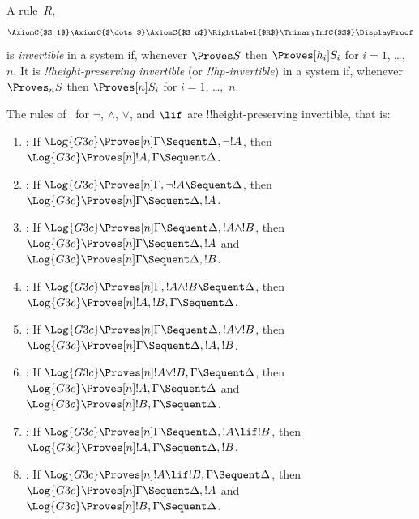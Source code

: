 \documentclass[../../../include/open-logic-section]{subfiles}
\begin{document}


\begin{defn}
A rule~$R$,
\[
\AxiomC{$S_1$}
\AxiomC{$\dots$}
\AxiomC{$S_n$}
\RightLabel{$R$}
\TrinaryInfC{$S$}
\DisplayProof
\]
is \emph{invertible} in a system if, whenever $\Proves S$ then
$\Proves[h_i] S_i$ for $i = 1$, \dots,~$n$. It is
\emph{!!{height}-preserving invertible} (or \emph{!!{hp}-invertible})
in a system if, whenever $\Proves_n S$ then $\Proves[n] S_i$ for $i =
1$, \dots,~$n$.
\end{defn}

\begin{lem}
The rules of~ for $\lnot$, $\land$, $\lor$, and $\lif$ are
!!{height}-preserving invertible, that is:
\begin{enumerate}
  \item \RightR{\lnot}: If $\Log{G3c} \Proves[n] \Gamma \Sequent
  \Delta, \lnot !A$, then $\Log{G3c} \Proves[n] !A, \Gamma \Sequent
  \Delta$.
  \item \LeftR{\lnot}: If $\Log{G3c} \Proves[n] \Gamma, \lnot !A
  \Sequent \Delta$, then $\Log{G3c} \Proves[n] \Gamma \Sequent \Delta,
  !A$.
  \item \RightR{\land}: If $\Log{G3c} \Proves[n] \Gamma \Sequent
  \Delta, !A \land !B$, then $\Log{G3c} \Proves[n] \Gamma \Sequent
  \Delta, !A$ and $\Log{G3c} \Proves[n] \Gamma \Sequent
  \Delta, !B$.
  \item \LeftR{\land}: If $\Log{G3c} \Proves[n] \Gamma, !A \land !B
  \Sequent \Delta$, then $\Log{G3c} \Proves[n] !A, !B, \Gamma \Sequent
  \Delta$.
  \item \RightR{\lor}: If $\Log{G3c} \Proves[n] \Gamma \Sequent
  \Delta, !A \lor !B$, then $\Log{G3c} \Proves[n] \Gamma \Sequent
  \Delta, !A, !B$.
  \item \LeftR{\lor}: If $\Log{G3c} \Proves[n] !A \lor !B, \Gamma \Sequent
  \Delta$, then $\Log{G3c} \Proves[n] !A, \Gamma \Sequent
  \Delta$ and $\Log{G3c} \Proves[n] !B, \Gamma \Sequent
  \Delta$.
  \item \RightR{\lif}: If $\Log{G3c} \Proves[n] \Gamma \Sequent
  \Delta, !A \lif !B$, then $\Log{G3c} \Proves[n] !A, \Gamma \Sequent
  \Delta, !B$.
  \item \LeftR{\lif}: If $\Log{G3c} \Proves[n] !A \lif !B, \Gamma
  \Sequent \Delta$, then $\Log{G3c} \Proves[n] \Gamma \Sequent \Delta,
  !A$ and $\Log{G3c} \Proves[n] !B, \Gamma \Sequent \Delta$.
\end{enumerate}
\end{lem}
\end{document}
